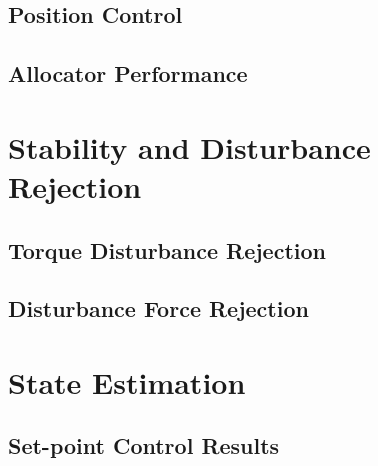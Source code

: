\subsection{Position Control}
\label{subsec:simulation.comparison.position}
\subsection{Allocator Performance}
\label{subsec:simulation.comparison.allocator}
\section{Stability and Disturbance Rejection}
\label{sec:simulation.disturbnace}
\subsection{Torque Disturbance Rejection}
\label{sec:simulation.disturbance.torque}
\subsection{Disturbance Force Rejection}
\label{sec:simulation.disturbance.force}
\section{State Estimation}
\label{sec:simulation.state}
\subsection{Set-point Control Results}
\label{sec:simulation.autopilot}
